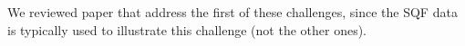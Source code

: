 We reviewed paper that address the first of these challenges, since the SQF data is typically used to illustrate this challenge (not the other ones).

